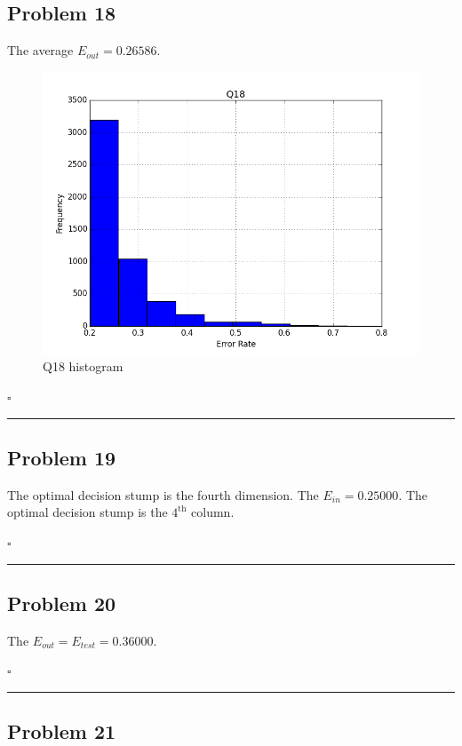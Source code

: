 \documentclass[12pt]{article}
\newcommand*{\QEDB}{\hfill\ensuremath{\square}}
\newcommand{\horrule}[1]{\rule{\linewidth}{#1}}
\begin{document}
\subsection*{Problem 18}

The average $E_{out}=0.26586$.
\begin{figure}[h]
	\centering
	\includegraphics[scale=0.3]{Q18.png}
	\caption{Q18 histogram}
	\label{Q18}
\end{figure}

\QEDB

\horrule{0.5pt}

\subsection*{Problem 19}

The optimal decision stump is the fourth dimension. The $E_{in}=0.25000$. The optimal decision stump is the $4^{\text{th}}$ column.

\QEDB

\horrule{0.5pt}

\subsection*{Problem 20}

The $E_{out}=E_{test}=0.36000$.

\QEDB

\horrule{0.5pt}

\subsection*{Problem 21}
\end{document}

